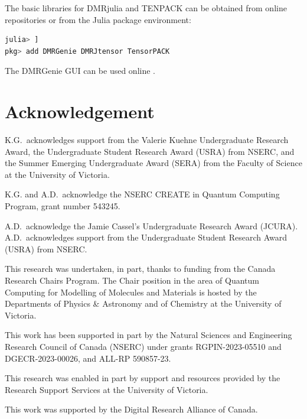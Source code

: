 \documentclass{juliacon}
\begin{document}
The basic libraries for DMRjulia and TENPACK can be obtained from online repositories \cite{dmrjulia,tenpack} or from the Julia package environment:
\begin{lstlisting}[language = Julia]
julia> ]
pkg> add DMRGenie DMRJtensor TensorPACK
\end{lstlisting}

The DMRGenie GUI can be used online \cite{dmrgenie}.

\section{Acknowledgement}

K.G.~acknowledges support from the Valerie Kuehne Undergraduate Research Award, the Undergraduate Student Research Award (USRA) from NSERC, and the Summer Emerging Undergraduate Award (SERA) from the Faculty of Science at the University of Victoria. 

K.G. and A.D.~acknowledge the NSERC CREATE in Quantum Computing Program, grant number 543245.

A.D.~acknowledge the Jamie Cassel's Undergraduate Research Award (JCURA). A.D.~acknowledges support from the Undergraduate Student Research Award (USRA) from NSERC.

This research was undertaken, in part, thanks to funding from the Canada Research Chairs Program. The Chair position in the area of Quantum Computing for Modelling of Molecules and Materials is hosted by the Departments of Physics \& Astronomy and of Chemistry at the University of Victoria. 

This work has been supported in part by the Natural Sciences and Engineering Research Council of Canada (NSERC) under grants RGPIN-2023-05510 and DGECR-2023-00026, and ALL-RP 590857-23.

This research was enabled in part by support and resources provided by the Research Support Services at the University of Victoria.

This work was supported by the Digital Research Alliance of Canada.



\end{document}

